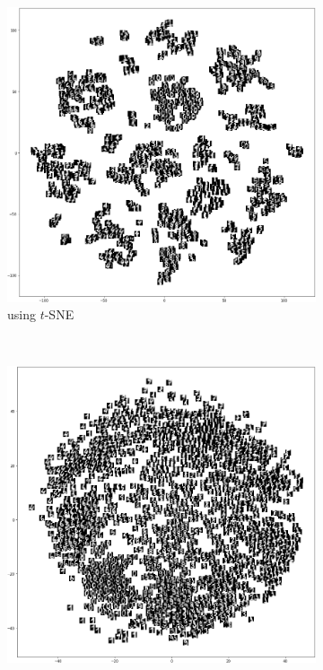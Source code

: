 \begin{figure}
	\centering
	\begin{subfigure}[b]{0.4\textwidth}
		\includegraphics[width=\textwidth]{./figures/tsne_2.png}
		\caption{using $t$-SNE}
	\end{subfigure}
	~
	\begin{subfigure}[b]{0.4\textwidth}
		\includegraphics[width=\textwidth]{./figures/mds_2.png}

\end{subfigure}
\end{figure}
